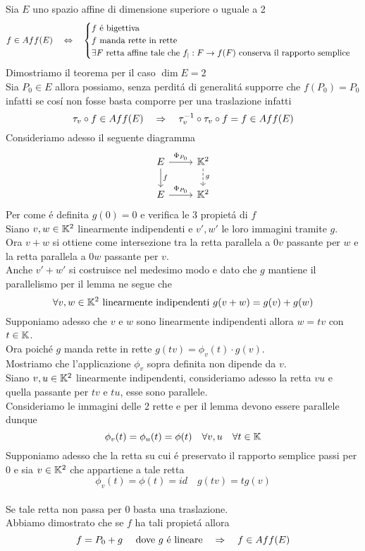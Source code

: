 \newpage
\begin{thm}Sia $E$ uno spazio affine di dimensione superiore o uguale a 2
$$ f \in Aff(E) \quad \Leftrightarrow \quad \begin{cases}
f \text{ \'e bigettiva} \\
f \text{ manda rette in rette} \\
\exists F \text{ retta affine tale che } f_\vert : F \to f(F) \text{ conserva il rapporto semplice}
\end{cases}$$
\proof Dimostriamo il teorema per il caso $\dim E = 2 $\\
Sia $P_0 \in E$ allora possiamo, senza perdit\'a di generalit\'a supporre che $f(P_0)=P_0$ infatti se cos\'i non fosse basta comporre per una traslazione infatti $$\tau_v \circ f \in Aff(E ) \quad \Rightarrow \quad\tau_v^{-1} \circ \tau_v \circ f = f \in Aff(E)$$
Consideriamo adesso il seguente diagramma
$$ \begin{tikzcd}
E \arrow[d,"f"]  \arrow{r}{\Phi_{P_0}}
& \K^2 \arrow[d,dashed,"g"] 
\\ E \arrow{r}{\Phi_{P_0}} &\K^2
\end{tikzcd}$$
Per come \'e definita $g(0)=0$ e verifica le 3 propiet\'a di $f$\\
Siano $v,w\in \mathbb{K}^2 $ linearmente indipendenti e  $v',w'$ le loro immagini tramite $g$.\\ 
Ora $v+w$ si ottiene come intersezione tra la retta parallela a $0v$ passante per $w$ e la retta parallela a $0w$ passante per $v$.\\
Anche $v'+w'$ si costruisce nel medesimo modo e dato che $g$ mantiene il parallelismo per il lemma ne segue che 
$$ \forall v , w \in \mathbb{K}^2 \text{ linearmente indipendenti } g(v+w) = g(v) + g(w)$$
Supponiamo adesso che $v$ e $w$ sono linearmente indipendenti allora $w=tv$ con $t \in \mathbb{K}$.\\
Ora poich\'e $g$ manda rette in rette $g(tv) = \phi_v(t) \cdot g(v) $.\\
Mostriamo che l'applicazione $\phi_v$ sopra definita non dipende da $v$.\\
Siano $v,u \in \mathbb{K}^2$ linearmente indipendenti, consideriamo adesso la retta  $vu$ e quella passante per $tv$ e $tu$, esse sono parallele.\\
Consideriamo le  immagini delle 2 rette e per il lemma devono essere parallele dunque$$\phi_v(t)=\phi_u(t) = \phi(t) \quad \forall v,u \quad \forall t \in \mathbb{K}$$
Supponiamo adesso che la retta su cui \'e preservato il rapporto semplice passi per $0$ e sia $v\in \mathbb{K}^2$ che appartiene a tale retta
$$ \phi_v(t) = \phi(t) = id \quad g(tv) = t g(v)$$
\\
Se tale retta non passa per $0$ basta una traslazione.\\
Abbiamo dimostrato che se $f$ ha tali propiet\'a allora 
$$ f = P_0 + g \quad \text{ dove } g \text{ \'e lineare} \quad \Rightarrow \quad f \in Aff(E)$$
\endproof
\end{thm}
